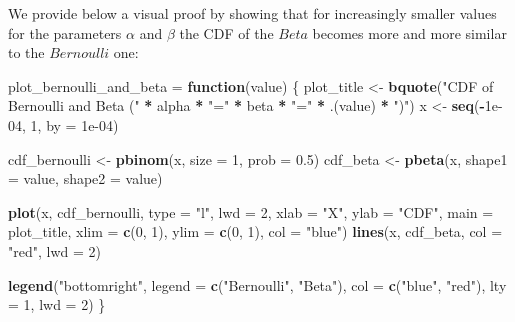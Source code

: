\documentclass[
]{article}
\newenvironment{Shaded}{\begin{snugshade}}{\end{snugshade}}
\newcommand{\AttributeTok}[1]{\textcolor[rgb]{0.13,0.29,0.53}{#1}}
\newcommand{\ControlFlowTok}[1]{\textcolor[rgb]{0.13,0.29,0.53}{\textbf{#1}}}
\newcommand{\DecValTok}[1]{\textcolor[rgb]{0.00,0.00,0.81}{#1}}
\newcommand{\FloatTok}[1]{\textcolor[rgb]{0.00,0.00,0.81}{#1}}
\newcommand{\FunctionTok}[1]{\textcolor[rgb]{0.13,0.29,0.53}{\textbf{#1}}}
\newcommand{\NormalTok}[1]{#1}
\newcommand{\OtherTok}[1]{\textcolor[rgb]{0.56,0.35,0.01}{#1}}
\newcommand{\SpecialCharTok}[1]{\textcolor[rgb]{0.81,0.36,0.00}{\textbf{#1}}}
\newcommand{\StringTok}[1]{\textcolor[rgb]{0.31,0.60,0.02}{#1}}
\begin{document}
We provide below a visual proof by showing that for increasingly smaller
values for the parameters \(\alpha\) and \(\beta\) the CDF of the
\(Beta\) becomes more and more similar to the \(Bernoulli\) one:

\begin{Shaded}
\begin{Highlighting}[]
\NormalTok{plot\_bernoulli\_and\_beta }\OtherTok{=} \ControlFlowTok{function}\NormalTok{(value) \{}
\NormalTok{    plot\_title }\OtherTok{\textless{}{-}} \FunctionTok{bquote}\NormalTok{(}\StringTok{"CDF of Bernoulli and Beta ("} \SpecialCharTok{*}
\NormalTok{        alpha }\SpecialCharTok{*} \StringTok{"="} \SpecialCharTok{*}\NormalTok{ beta }\SpecialCharTok{*} \StringTok{"="} \SpecialCharTok{*}\NormalTok{ .(value) }\SpecialCharTok{*} \StringTok{")"}\NormalTok{)}
\NormalTok{    x }\OtherTok{\textless{}{-}} \FunctionTok{seq}\NormalTok{(}\SpecialCharTok{{-}}\FloatTok{1e{-}04}\NormalTok{, }\DecValTok{1}\NormalTok{, }\AttributeTok{by =} \FloatTok{1e{-}04}\NormalTok{)}

\NormalTok{    cdf\_bernoulli }\OtherTok{\textless{}{-}} \FunctionTok{pbinom}\NormalTok{(x, }\AttributeTok{size =} \DecValTok{1}\NormalTok{, }\AttributeTok{prob =} \FloatTok{0.5}\NormalTok{)}
\NormalTok{    cdf\_beta }\OtherTok{\textless{}{-}} \FunctionTok{pbeta}\NormalTok{(x, }\AttributeTok{shape1 =}\NormalTok{ value, }\AttributeTok{shape2 =}\NormalTok{ value)}

    \FunctionTok{plot}\NormalTok{(x, cdf\_bernoulli, }\AttributeTok{type =} \StringTok{"l"}\NormalTok{, }\AttributeTok{lwd =} \DecValTok{2}\NormalTok{, }\AttributeTok{xlab =} \StringTok{"X"}\NormalTok{,}
        \AttributeTok{ylab =} \StringTok{"CDF"}\NormalTok{, }\AttributeTok{main =}\NormalTok{ plot\_title, }\AttributeTok{xlim =} \FunctionTok{c}\NormalTok{(}\DecValTok{0}\NormalTok{,}
            \DecValTok{1}\NormalTok{), }\AttributeTok{ylim =} \FunctionTok{c}\NormalTok{(}\DecValTok{0}\NormalTok{, }\DecValTok{1}\NormalTok{), }\AttributeTok{col =} \StringTok{"blue"}\NormalTok{)}
    \FunctionTok{lines}\NormalTok{(x, cdf\_beta, }\AttributeTok{col =} \StringTok{"red"}\NormalTok{, }\AttributeTok{lwd =} \DecValTok{2}\NormalTok{)}

    \FunctionTok{legend}\NormalTok{(}\StringTok{"bottomright"}\NormalTok{, }\AttributeTok{legend =} \FunctionTok{c}\NormalTok{(}\StringTok{"Bernoulli"}\NormalTok{, }\StringTok{"Beta"}\NormalTok{),}
        \AttributeTok{col =} \FunctionTok{c}\NormalTok{(}\StringTok{"blue"}\NormalTok{, }\StringTok{"red"}\NormalTok{), }\AttributeTok{lty =} \DecValTok{1}\NormalTok{, }\AttributeTok{lwd =} \DecValTok{2}\NormalTok{)}
\NormalTok{\}}
\end{Highlighting}
\end{Shaded}
\end{document}
